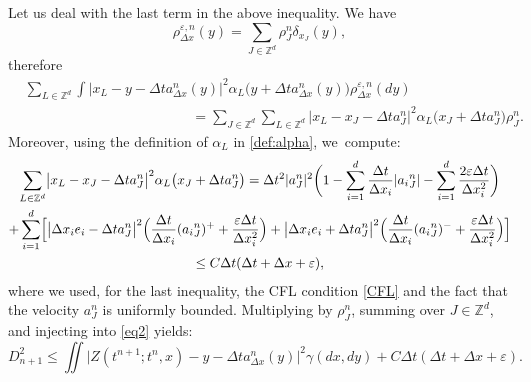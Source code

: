 \documentclass[11pt]{article}
\numberwithin{equation}{section}
\def\ZZ{\mathbb{Z}}
\def\eps{\varepsilon}
\def\dt{\Delta t}
\def\dx{\Delta x}
\theoremstyle{plain}
\theoremstyle{definition}
\begin{document}
Let us deal with the last term in the above inequality.
We have\vspace*{-3pt}
\[
\rho_{\dx}^{\eps,n}(y) = \sum_{J\in\ZZ^d} \rho_J^n \delta_{x_J}(y),
\]
therefore\vspace*{-3pt}
\begin{align*}
&\sum_{L\in \ZZ^d} \int \bigl|x_L-y-\dt a^n_{\dx}(y)\bigr|^2 \alpha_L\bigl(y+\dt a^n_{\dx}(y)\bigr) \rho_{\dx}^{\eps,n}(dy) \\[-5pt]
&\hspace{5cm} = \sum_{J\in \ZZ^d} \sum_{L\in \ZZ^d} \bigl|x_L-x_J-\dt a^n_J\bigr|^2 \alpha_L\bigl(x_J+\dt a^n_J\bigr) \rho_J^n.
\end{align*}
Moreover, using the definition of $\alpha_L$ in \eqref{def:alpha}, we~compute:\vspace*{-5pt}
\begin{multline*}
\sum_{L\in \ZZ^d} \bigl|x_L-x_J-\dt a^n_J\bigr|^2 \alpha_L\bigl(x_J+\dt a^n_J\bigr)
= \dt^2 |a_J^n|^2 \biggl(1-\sum_{i=1}^d \frac{\dt}{\dx_i} |{a_i}_J^n| - \sum_{i=1}^d \frac{2\eps\dt}{\dx_i^2}\biggr) \\
+ \sum_{i=1}^d \Bigl[ \bigl|\dx_i e_i -\dt a^n_J\bigr|^2 \Big(\frac{\dt}{\dx_i} ({a_i}_J^n)^+ + \frac{\eps\dt}{\dx_i^2}\Big)+
\bigl|\dx_i e_i +\dt a^n_J\bigr|^2 \Big(\frac{\dt}{\dx_i} ({a_i}_J^n)^- + \frac{\eps\dt}{\dx_i^2}\Big) \Bigr] \\
\leq C\dt(\dt + \dx + \eps),
\end{multline*}
where we used, for the last inequality, the CFL condition \eqref{CFL} and the fact that the velocity $a_J^n$ is uniformly bounded. Multiplying by $\rho_J^n$, summing over $J \in \ZZ^d$, and injecting into \eqref{eq2} yields:
\begin{equation}\label{eqD1}
D_{n+1}^2 \leq \iint \bigl|Z(t^{n+1};t^n,x)-y-\dt a^n_{\dx}(y)\bigr|^2 \gamma(dx,dy) + C \dt (\dt+\dx+\eps).
\end{equation}
\end{document}
